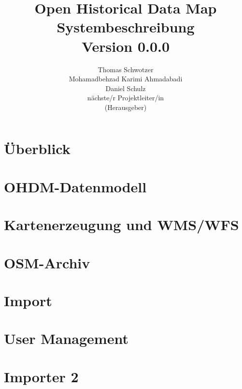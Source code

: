 \documentclass[german]{book}
\begin{document}
\title{Open Historical Data Map\\
Systembeschreibung \\
Version 0.0.0
}

\author{
Thomas Schwotzer \\
Mohamadbehzad Karimi Ahmadabadi\\
Daniel Schulz\\
nächste/r Projektleiter/in\\
(Herausgeber)
}

\maketitle

\tableofcontents

\chapter{Überblick}


\chapter{OHDM-Datenmodell}


\chapter{Kartenerzeugung und WMS/WFS}


\chapter{OSM-Archiv}


\chapter{Import}


\chapter{User Management}


\chapter{Importer 2}

\end{document}
